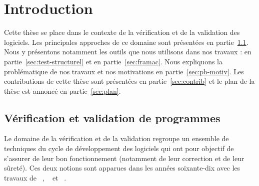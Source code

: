 
\chapter{Introduction}
\label{sec:intro}


\chapterintro


Cette thèse se place dans le contexte de la vérification et de la validation des
logiciels.
Les principales approches de ce domaine sont présentées en partie~\ref{sec:vv}.
Nous y présentons notamment les outils que nous utilisons dans nos travaux :
\pathcrawler en partie~\ref{sec:test-structurel} et \framac en
partie~\ref{sec:framac}.
Nous expliquons la problématique de nos travaux et nos motivations en
partie~\ref{sec:pb-motiv}.
Les contributions de cette thèse sont présentées en partie~\ref{sec:contrib} et
le plan de la thèse est annoncé en partie~\ref{sec:plan}.


\section{Vérification et validation de programmes}
\label{sec:vv}


Le domaine de la vérification et de la validation regroupe un ensemble de
techniques du cycle de développement des logiciels qui ont pour objectif de
s'assurer de leur bon fonctionnement (notamment de leur correction et de leur
sûreté).
Ces deux notions sont apparues dans les années soixante-dix avec les travaux de
~\cite{Dijkstra/75}, ~\cite{Floyd/63} et
~\cite{Hoare/69}.

